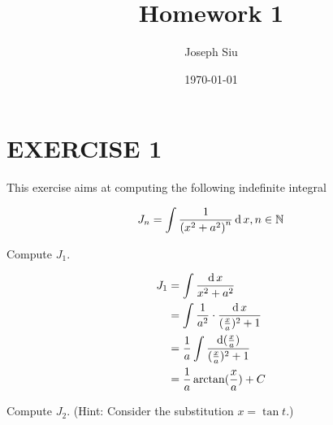 \documentclass{homework}
\author{Joseph Siu}
\date{\today}
\title{Homework 1}
\newcommand{\?}{\stackrel{?}{=}}
\theoremstyle{definition}
\begin{document}
 \maketitle

\section*{EXERCISE 1}
This exercise aims at computing the following indefinite integral

$$J_{n}=\int \frac{1}{\left(x^{2}+a^{2}\right)^{n}}\operatorname{d} x, n \in \mathbb{N}$$

\question Compute $J_{1}$.

\begin{align*}
    J_1&=\int \frac{\operatorname{d} x}{x^2+a^2}\\
    &=\int \frac1{a^2}\cdot\frac{\operatorname{d} x}{(\frac{x}a)^2+1}\\
    &=\frac1a \int \frac{\operatorname{d} (\frac{x}a)}{(\frac{x}a)^2+1}\\
    &=\frac1a\arctan(\frac{x}a)+C
\end{align*}
\newpage

\question Compute $J_{2}$. (Hint: Consider the substitution $x=\tan t$.)
\end{document}
